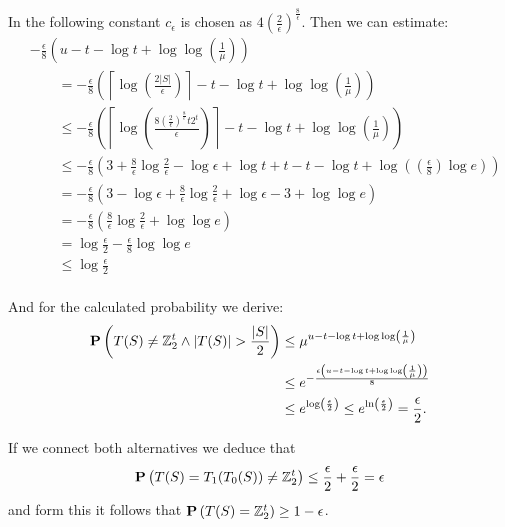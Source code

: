 In the following constant $c_{\epsilon}$ is chosen as $4\left(\frac{2}{\epsilon}\right) ^ {\frac{8}{\epsilon}}$. Then we can estimate:
\[
\begin{split}
& -\frac{\epsilon}{8} \left(u - t - \log t + \log \log \left( \frac{1}{\mu} \right) \right) \\
& \qquad = -\frac{\epsilon}{8}\left(\left\lceil\log\left(\frac{2|S|}{\epsilon}\right)\right\rceil - t - \log t + \log\log\left(\frac{1}{\mu}\right)\right) \\
& \qquad \leq -\frac{\epsilon}{8} \left( \left\lceil \log\left( \frac{8 \left(\frac{2}{\epsilon}\right) ^ {\frac{8}{\epsilon}}t2^t}{\epsilon} \right) \right\rceil - t - \log t + \log\log\left(\frac{1}{\mu}\right)\right) \\
& \qquad \leq -\frac{\epsilon}{8} \left(3 + \frac{8}{\epsilon}\log\frac{2}{\epsilon} - \log\epsilon + \log t + t - t - \log t + \log \left( \left(\frac{\epsilon}{8}\right)\log e \right) \right) \\
& \qquad = -\frac{\epsilon}{8} \left(3 - \log\epsilon + \frac{8}{\epsilon} \log \frac{2}{\epsilon} + \log\epsilon - 3 + \log\log e\right) \\
& \qquad = -\frac{\epsilon}{8}\left(\frac{8}{\epsilon}\log \frac{2}{\epsilon} + \log\log e\right) \\
& \qquad = \log \frac{\epsilon}{2} - \frac{\epsilon}{8} \log\log e \\
& \qquad \leq \log\frac{\epsilon}{2} \\
\end{split}
\]

And for the calculated probability we derive:
\[
\begin{split}
\mathbf{P}\left(T(S) \neq \mathbb{Z}_{2}^{t} \wedge |T(S)| > \frac{|S|}{2}\right) 
	& \leq \mu ^ {u - t - \log t + \log\log\left(\frac{1}{\mu}\right)} \\
	& \leq e ^ {-\frac{\epsilon\left(u - t - \log t + \log\log\left(\frac{1}{\mu}\right)\right)}{8}} \\
	& \leq e ^ {\log \left( \frac{\epsilon}{2} \right)} \leq e ^ {\ln \left(\frac{\epsilon}{2}\right)} = \frac{\epsilon}{2} \text{.}
\end{split}
\]

If we connect both alternatives we deduce that 
\[ 
	\mathbf{P}\left(T(S) = T_1(T_0(S)) \neq \mathbb{Z}_{2}^{t}\right) \leq \frac{\epsilon}{2} + \frac{
\epsilon}{2} = \epsilon
\]
and form this it follows that $\mathbf{P}\left(T(S) = \mathbb{Z}_{2}^{t}\right) \geq 1 - \epsilon$.
